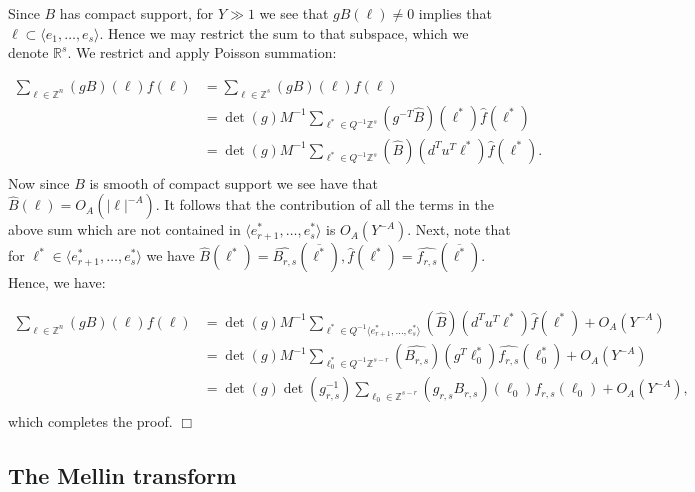 \documentclass{article}
\def\Z{{\mathbb Z}}
\def\R{{\mathbb R}}
\def\Z{{\mathbb Z}}
\def\ol{\overline}
\newenvironment{proof}{\noindent {\bf Proof:}}{$\Box$ \vspace{2 ex}}
\begin{document}
\begin{proof}
Since $B$ has compact support, for $Y\gg 1$ we see that $gB(\ell)\neq 0$ implies that $\ell\subset \langle e_1,\dots,e_s\rangle$. Hence we may restrict the sum to that subspace, which we denote $\R^s$. We restrict and apply Poisson summation:

\begin{align*}
    \sum_{\ell\in \Z^n}(gB)(\ell)f(\ell)&=\sum_{\ell\in \Z^s}(gB)(\ell)f(\ell)
    \\&=\det(g)M^{-1}\sum_{\ell^*\in Q^{-1}\Z^s}(g^{-T}\hat{B})(\ell^*)\hat{f}(\ell^*)\\
    &=\det(g)M^{-1}\sum_{\ell^*\in Q^{-1}\Z^s}(\hat{B})(d^Tu^T\ell^*)\hat{f}(\ell^*).\\
\end{align*}
Now since $B$ is smooth of compact support we see have that $\hat{B}(\ell) = O_A(|\ell|^{-A})$. It follows that the contribution of all the terms in the above sum which are not contained in $\langle e^*_{r+1},\dots,e^*_{s}\rangle$ is $O_A(Y^{-A})$.  Next, note that for $\ell^*\in\langle e^*_{r+1},\dots,e^*_{s}\rangle$ we have
$\hat{B}(\ell^*)=\widehat{B_{r,s}}(\ol{\ell^*}),\hat{f}(\ell^*)=\widehat{f_{r,s}}(\ol{\ell^*})$. Hence, we have:

\begin{align*}
    \sum_{\ell\in \Z^n}(gB)(\ell)f(\ell)&=\det(g)M^{-1}\sum_{\ell^*\in Q^{-1}\langle e^*_{r+1},\dots,e^*_{s}\rangle}(\hat{B})(d^Tu^T\ell^*)\hat{f}(\ell^*) + O_A(Y^{-A})\\
    &=\det(g)M^{-1}\sum_{\ell_0^*\in Q^{-1}\Z^{s-r}}(\hat{B_{r,s}})(g^T\ell_0^*)\widehat{f_{r,s}}(\ell_0^*) + O_A(Y^{-A})\\
    &=\det(g)\det(g_{r,s}^{-1})\sum_{\ell_0\in \Z^{s-r}}(g_{r,s}B_{r,s})(\ell_0)f_{r,s}(\ell_0) + O_A(Y^{-A}),\\
\end{align*}
which completes the proof.
\end{proof}





\subsection{The Mellin transform}
\end{document}
